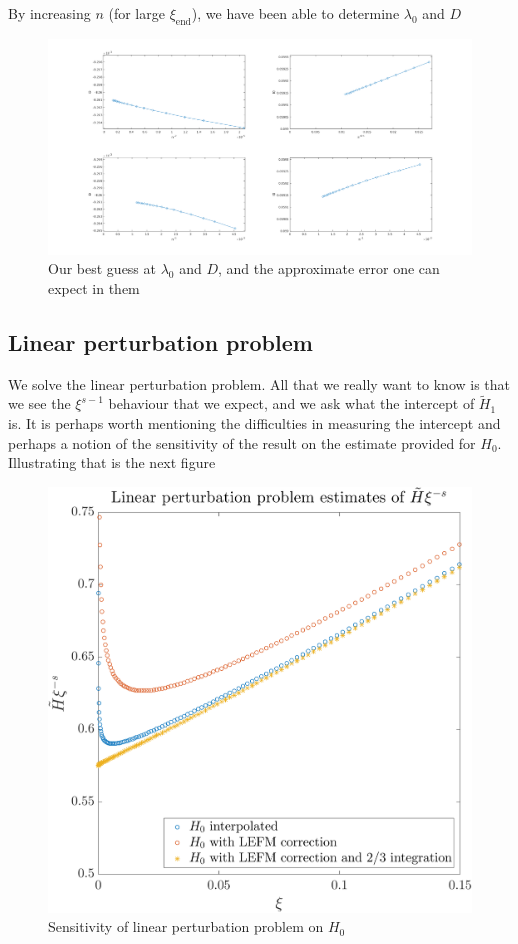 \documentclass{jfm}
\begin{document}
By increasing $n$ (for large $\xi_{\mathrm{end}}$), we have been able to 
determine $\lambda_0$ and $D$
\begin{figure}
  \centerline{\includegraphics[scale=0.3]{./../../Graphs/l0-D.png}}
  \caption{Our best guess at $\lambda_0$ and $D$, and the approximate error
one can expect in them}
\end{figure}
\subsection{Linear perturbation problem}
We solve the linear perturbation problem. All that we really want to know
is that we see the $\xi^{s-1}$ behaviour that we expect, and we ask what the
intercept of $\tilde{H}_1$ is. It is perhaps worth mentioning the difficulties
in measuring the intercept and perhaps a notion of the sensitivity of the 
result on the estimate provided for $H_0$. Illustrating that is the next
figure 
\begin{figure}
 \centerline{\includegraphics[scale=0.3]{./../../Graphs/linear-perturbation.pdf}}
  \caption{Sensitivity of linear perturbation problem on $H_0$}
\end{figure}
\end{document}

